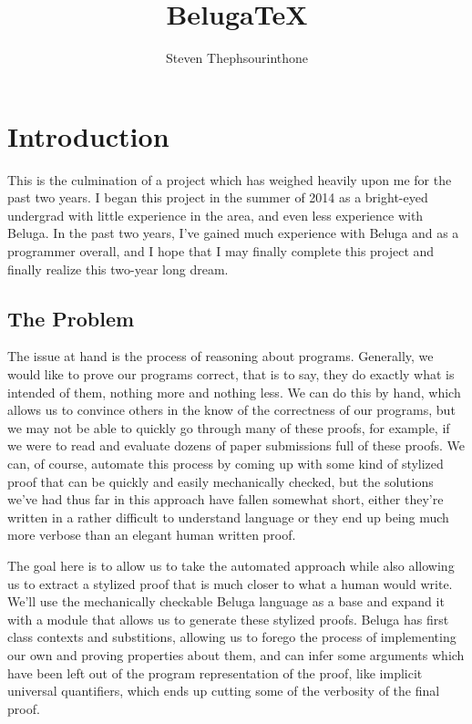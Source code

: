 \documentclass[11pt]{article} %
\title{BelugaTeX}
\author{Steven Thephsourinthone}
\begin{document}
\maketitle

\section{Introduction}

This is the culmination of a project which has weighed heavily upon me for the past two years. I began this project in the summer of 2014 as a bright-eyed undergrad with little experience in the area, and even less experience with Beluga. In the past two years, I've gained much experience with Beluga and as a programmer overall, and I hope that I may finally complete this project and finally realize this two-year long dream.

\subsection{The Problem}

The issue at hand is the process of reasoning about programs. Generally, we would like to prove our programs correct, that is to say, they do exactly what is intended of them, nothing more and nothing less. We can do this by hand, which allows us to convince others in the know of the correctness of our programs, but we may not be able to quickly go through many of these proofs, for example, if we were to read and evaluate dozens of paper submissions full of these proofs. We can, of course, automate this process by coming up with some kind of stylized proof that can be quickly and easily mechanically checked, but the solutions we've had thus far in this approach have fallen somewhat short, either they're written in a rather difficult to understand language or they end up being much more verbose than an elegant human written proof.

The goal here is to allow us to take the automated approach while also allowing us to extract a stylized proof that is much closer to what a human would write. We'll use the mechanically checkable Beluga language as a base and expand it with a module that allows us to generate these stylized proofs. Beluga has first class contexts and substitions, allowing us to forego the process of implementing our own and proving properties about them, and can infer some arguments which have been left out of the program representation of the proof, like implicit universal quantifiers, which ends up cutting some of the verbosity of the final proof.
\end{document}
